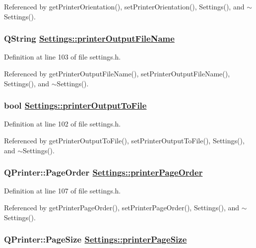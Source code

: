 Referenced by get\-Printer\-Orientation(), set\-Printer\-Orientation(), Settings(), and $\sim$Settings().\hypertarget{classSettings_r11}{
\subsubsection[printerOutputFileName]{\setlength{\rightskip}{0pt plus 5cm}QString \hyperlink{classSettings_r11}{Settings::printer\-Output\-File\-Name}}}
\label{classSettings_r11}


Definition at line 103 of file settings.h.

Referenced by get\-Printer\-Output\-File\-Name(), set\-Printer\-Output\-File\-Name(), Settings(), and $\sim$Settings().\hypertarget{classSettings_r10}{
\subsubsection[printerOutputToFile]{\setlength{\rightskip}{0pt plus 5cm}bool \hyperlink{classSettings_r10}{Settings::printer\-Output\-To\-File}}}
\label{classSettings_r10}


Definition at line 102 of file settings.h.

Referenced by get\-Printer\-Output\-To\-File(), set\-Printer\-Output\-To\-File(), Settings(), and $\sim$Settings().\hypertarget{classSettings_r15}{
\subsubsection[printerPageOrder]{\setlength{\rightskip}{0pt plus 5cm}QPrinter::Page\-Order \hyperlink{classSettings_r15}{Settings::printer\-Page\-Order}}}
\label{classSettings_r15}


Definition at line 107 of file settings.h.

Referenced by get\-Printer\-Page\-Order(), set\-Printer\-Page\-Order(), Settings(), and $\sim$Settings().\hypertarget{classSettings_r14}{
\subsubsection[printerPageSize]{\setlength{\rightskip}{0pt plus 5cm}QPrinter::Page\-Size \hyperlink{classSettings_r14}{Settings::printer\-Page\-Size}}}
\label{classSettings_r14}


